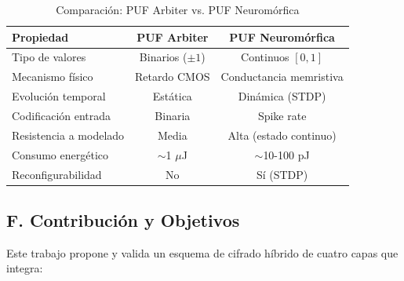 \begin{table}[H]
    \centering\footnotesize\setlength{\tabcolsep}{3pt}
    \caption{Comparación: PUF Arbiter vs. PUF Neuromórfica}
    \label{tab:neuro-comparison}
    \begin{tabular}{|l|c|c|}
        \hline
        \textbf{Propiedad} & \textbf{PUF Arbiter} & \textbf{PUF Neuromórfica} \\
        \hline
        Tipo de valores & Binarios ($\pm1$) & Continuos $[0,1]$ \\
        \hline
        Mecanismo físico & Retardo CMOS & Conductancia memristiva \\
        \hline
        Evolución temporal & Estática & Dinámica (STDP) \\
        \hline
        Codificación entrada & Binaria & Spike rate \\
        \hline
        Resistencia a modelado & Media & Alta (estado continuo) \\
        \hline
        Consumo energético & $\sim$1 $\mu$J & $\sim$10-100 pJ \\
        \hline
        Reconfigurabilidad & No & Sí (STDP) \\
        \hline
    \end{tabular}
\end{table}

\subsection*{F. Contribución y Objetivos}

Este trabajo propone y valida un esquema de cifrado híbrido de cuatro capas que integra:

